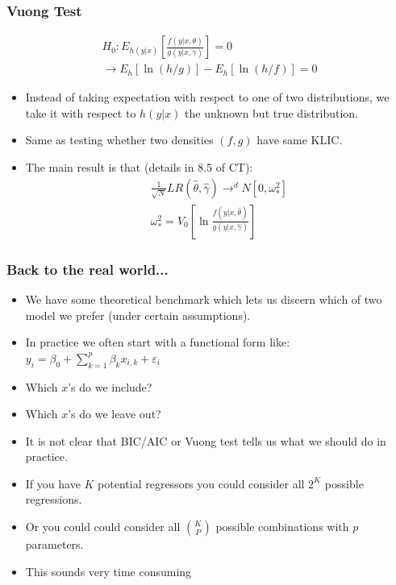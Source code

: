 \documentclass[xcolor=pdftex,dvipsnames,table,mathserif]{beamer}
\begin{document}
\begin{frame}
\frametitle{Vuong Test}
\begin{eqnarray*}
H_0: E_{h(y|x)} \left[ \frac{ f(y | x,\theta) }{g(y | x, \gamma)} \right] = 0  \\
\rightarrow E_h[\ln(h/g)] - E_h[\ln (h/f)] = 0
\end{eqnarray*}
\begin{itemize}
\item Instead of taking expectation with respect to one of two distributions, we take it with respect to $h(y |x)$ the unknown but \alert{true distribution}.
\item Same as testing whether two densities $(f,g)$ have same KLIC.
\item The main result is that (details in 8.5 of CT):
\begin{eqnarray*}
\frac{1}{\sqrt{N}} LR(\hat{\theta},\hat{\gamma}) \rightarrow^d N [0,\omega_{*}^2]\\
\omega_{*}^2 =  V_0 \left[ \ln \frac{f(y| x, \hat{\theta})}{g(y| x, \hat{\gamma})}  \right]
\end{eqnarray*}
\end{itemize}
\end{frame}

\begin{frame}
\frametitle{Back to the real world...}
\begin{itemize}
\item We have some theoretical benchmark which lets us discern which of two model we prefer (under certain assumptions).
\item In practice we often start with a functional form like:\\
 $y_i = \beta_0 + \sum_{k=1}^p \beta_k x_{i,k} + \varepsilon_{i}$
 \item Which $x$'s do we include?
 \item Which $x$'s do we leave out?
 \item It is not clear that BIC/AIC or Vuong test tells us what we should do in practice.
 \item If you have $K$ potential regressors you could consider all $2^K$ possible regressions.
 \item Or you could could consider all $K \choose P$ possible combinations with $p$ parameters.
 \item This sounds very time consuming
\end{itemize}
\end{frame}
\end{document}
